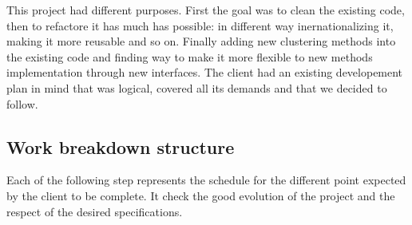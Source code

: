 
This project had different purposes. First the goal was to clean the existing code, then to refactore it has much has possible: in different way inernationalizing it, making it more reusable and so on. Finally adding new clustering methods into the existing code and finding way to make it more flexible to new methods implementation through new interfaces.
The client had an existing developement plan in mind that was logical, covered all its demands and that we decided to follow.


\subsection{Work breakdown structure}
Each of the following step represents the schedule for the different point expected by the client to be complete. It check the good evolution of the project and the respect of the desired specifications.
